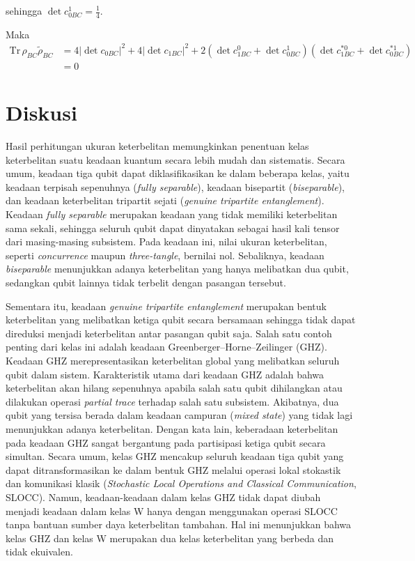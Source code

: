 sehingga $\det c_{0BC}^1 = \frac{1}{4}$.

Maka
\begin{equation}
	\begin{aligned}
		\mathrm{Tr}\,\rho_{BC}\tilde{\rho}_{BC}
		&=4|\det c_{0BC}|^2+4|\det c_{1BC}|^2+2(\det c_{1BC}^0+ \det c_{0BC}^1)(\det c^{*0}_{1BC} + \det c^{*1}_{0BC})\\
		&=0
	\end{aligned}
\end{equation}

\section{Diskusi}
Hasil perhitungan ukuran keterbelitan memungkinkan penentuan kelas keterbelitan suatu keadaan kuantum secara lebih mudah dan sistematis. Secara umum, keadaan tiga qubit dapat diklasifikasikan ke dalam beberapa kelas, yaitu keadaan terpisah sepenuhnya (\textit{fully separable}), keadaan bisepartit (\textit{biseparable}), dan keadaan keterbelitan tripartit sejati (\textit{genuine tripartite entanglement}). Keadaan \textit{fully separable} merupakan keadaan yang tidak memiliki keterbelitan sama sekali, sehingga seluruh qubit dapat dinyatakan sebagai hasil kali tensor dari masing-masing subsistem. Pada keadaan ini, nilai ukuran keterbelitan, seperti \textit{concurrence} maupun \textit{three-tangle}, bernilai nol. Sebaliknya, keadaan \textit{biseparable} menunjukkan adanya keterbelitan yang hanya melibatkan dua qubit, sedangkan qubit lainnya tidak terbelit dengan pasangan tersebut.

Sementara itu, keadaan \textit{genuine tripartite entanglement} merupakan bentuk keterbelitan yang melibatkan ketiga qubit secara bersamaan sehingga tidak dapat direduksi menjadi keterbelitan antar pasangan qubit saja. Salah satu contoh penting dari kelas ini adalah keadaan Greenberger--Horne--Zeilinger (GHZ). Keadaan GHZ merepresentasikan keterbelitan global yang melibatkan seluruh qubit dalam sistem. Karakteristik utama dari keadaan GHZ adalah bahwa keterbelitan akan hilang sepenuhnya apabila salah satu qubit dihilangkan atau dilakukan operasi \textit{partial trace} terhadap salah satu subsistem. Akibatnya, dua qubit yang tersisa berada dalam keadaan campuran (\textit{mixed state}) yang tidak lagi menunjukkan adanya keterbelitan. Dengan kata lain, keberadaan keterbelitan pada keadaan GHZ sangat bergantung pada partisipasi ketiga qubit secara simultan. Secara umum, kelas GHZ mencakup seluruh keadaan tiga qubit yang dapat ditransformasikan ke dalam bentuk GHZ melalui operasi lokal stokastik dan komunikasi klasik (\textit{Stochastic Local Operations and Classical Communication}, SLOCC). Namun, keadaan-keadaan dalam kelas GHZ tidak dapat diubah menjadi keadaan dalam kelas W hanya dengan menggunakan operasi SLOCC tanpa bantuan sumber daya keterbelitan tambahan. Hal ini menunjukkan bahwa kelas GHZ dan kelas W merupakan dua kelas keterbelitan yang berbeda dan tidak ekuivalen.

